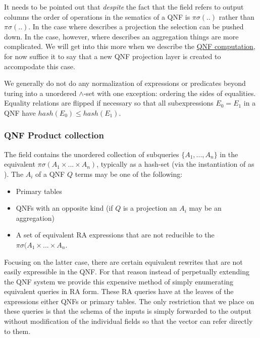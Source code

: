 It needs to be pointed out that \emph{despite} the fact that the 
field refers to output columns the order of operations in the sematics
of a QNF is \(\pi\sigma(..)\) rather than \(\pi\sigma(..)\). In the
case where  describes a projection the selection can be pushed
down. In the case, however, where  describes an aggregation
things are more complicated. We will get into this more when we
describe the \hyperref[sec:org3f1036f]{QNF computation}, for now suffice it to say that a new QNF
projection layer is created to accompodate this case.

We generally do not do any normalization of expressions or predicates
beyond turing  into a unordered \(\land\)-set with one
exception: ordering the sides of equalities. Equality relations are
flipped if necessary so that all subexpressions \(E_0 = E_1\) in a QNF
have \(hash(E_0) \le hash(E_1)\).


\subsubsection{QNF Product collection}
\label{sec:org86e5e2d}
The  field contains the
unordered collection of subqueries \(\{A_1,... , A_n\}\) in the
equivalent \(\pi \sigma (A_1 \times ... \times A_n)\), typically as a
hash-set (via the instantiation of  as
). The \(A_i\) of a QNF \(Q\) terms may be one of the
following:

\begin{itemize}
\item Primary tables
\item QNFs with an opposite kind  (if \(Q\) is a projection an
  \(A_i\) may be an aggregation)
\item A set of equivalent RA expressions that are not reducible to the
  \(\pi \sigma(A_1 \times ... \times A_n\).
\end{itemize}

Focusing on the latter case, there are certain equivalent rewrites
that are not easily expressible in the QNF. For that reason instead of
perpetually extending the QNF system we provide this expensive method
of simply enumerating equivalent queries in RA form. These RA queries
have at the leaves of the expressions either QNFs or primary
tables. The only restriction that we place on these queries is that
the schema of the inputs is simply forwarded to the output without
modification of the individual fields so that the  vector can
refer directly to them.

